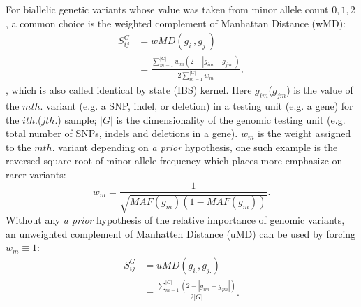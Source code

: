 For biallelic genetic variants whose value was taken from minor allele count ${0, 1, 2}$, a common choice is the weighted complement of Manhattan Distance (wMD):
\begin{equation} \label{eq:wSG}
\begin{split}
  S_{ij}^G &= wMD(g_{i.},g_{j.}) \\
  &= \frac{\sum_{m=1}^{|G|}{w_m(2-|g_{im}-g_{jm}|)}} {2\sum_{m=1}^{|G|}{w_m}},
\end{split}
\end{equation}
, which is also called identical by state (IBS) kernel. Here $g_{im}$($g_{jm}$) is the value of the $m th.$ variant (e.g. a SNP, indel, or deletion) in a testing unit (e.g. a gene) for the $i th.$($j th.$) sample; $|G|$ is the dimensionality of the genomic testing unit (e.g. total number of SNPs, indels and deletions in a gene). $w_m$ is the weight assigned to the $m th.$ variant depending on \textit{a prior} hypothesis, one such example is the reversed square root of minor allele frequency which places more emphasize on rarer variants:
\begin{displaymath}w_m=\frac{1}{\sqrt{MAF(g_m)(1-MAF(g_m))}}.\end{displaymath}
Without any \textit{a prior} hypothesis of the relative importance of genomic variants, an unweighted complement of Manhatten Distance (uMD) can be used by forcing $w_m \equiv 1$:
\begin{equation*} \label{eq:uSG}
\begin{split}
  S_{ij}^G &= uMD(g_{i.}, g_{j.}) \\
  &= \frac{\sum_{m = 1}^{|G|}{(2-|g_{im} - g_{jm}|)}}  {2|G|}.
\end{split}
\end{equation*}

